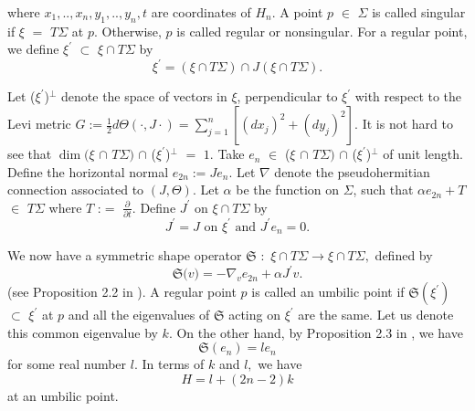 \documentclass[12pt]{amsart}
\theoremstyle{definition}\newtheorem{exa}[thm]{\sc Example}
\theoremstyle{definition}\newtheorem{de}[thm]{\sc Definition}
\theoremstyle{definition}\newtheorem{rem}[thm]{\sc Remark}
\theoremstyle{definition}\newtheorem{prob}[thm]{\it Problem}
\theoremstyle{definition}\newtheorem{fact}[thm]{\sc Fact}
\theoremstyle{definition}\newtheorem{claim}[thm]{\sc Claim}
\numberwithin{equation}{section}
\begin{document}
\noindent where $x_{1},..,x_{n},y_{1},..,y_{n},t$ are coordinates of $H_{n}.$
A point $p$ $\in $ $\Sigma $ is called singular if $\xi $ $=$ $T\Sigma $ at $p.$ Otherwise, $p$ is called regular or nonsingular. For a regular point, we define $\xi ^{\prime }$ $\subset $ $\xi \cap T\Sigma $ by
\begin{equation*}
\xi ^{\prime }=(\xi \cap T\Sigma )\cap J(\xi \cap T\Sigma ).
\end{equation*}

\noindent Let ($\xi ^{\prime }$)$^{\bot }$ denote the space of vectors in $\xi $, perpendicular to $\xi ^{\prime }$ with respect to the Levi metric $G:=\frac{1}{2}d\Theta (\cdot ,J\cdot )=\sum_{j=1}^{n}[(dx_{j})^{2}+(dy_{j})^{2}].$ It is not hard to see that $\dim (\xi 
$ $\cap $ $T\Sigma )$ $\cap $ ($\xi ^{\prime }$)$^{\bot }$ $=$ $1.$ Take $e_{n}$ $\in $ ($\xi $ $\cap $ $T\Sigma )$ $\cap $ ($\xi ^{\prime }$)$^{\bot
} $ of unit length. Define the horizontal normal $e_{2n}:=Je_{n}$. Let 
$\nabla $ denote the pseudohermitian connection associated to $(J,\Theta ).$
Let $\alpha $ be the function on $\Sigma $, such that $\alpha e_{2n}+T$ $\in 
$ $T\Sigma $ where $T$ :$=$ $\frac{\partial }{\partial t}.$ Define $J^{\prime }$ on $\xi \cap T\Sigma $ by
\begin{equation*}
J^{\prime }=J\text{ on }\xi ^{\prime }\text{ and }J^{\prime }e_{n}=0.
\end{equation*}

\noindent We now have a symmetric shape operator $\mathfrak{S}$ $:$ $\xi
\cap T\Sigma \rightarrow \xi \cap T\Sigma ,$ defined by
\begin{equation}
\mathfrak{S(}v\mathfrak{)}=-\nabla _{v}e_{2n}+\alpha J^{\prime }v.
\label{1-1}
\end{equation}
(see Proposition 2.2 in \cite{CCHY1}). A regular point $p$ is
called an umbilic point if $\mathfrak{S}(\xi ^{\prime })$ $\subset $ $\xi
^{\prime }$ at $p$ and all the eigenvalues of $\mathfrak{S}$ acting on $\xi
^{\prime }$ are the same. Let us denote this common eigenvalue by $k.$ On the other hand, by Proposition 2.3
in \cite{CCHY1}, we have
\begin{equation*}
\mathfrak{S}(e_{n})=le_{n}
\end{equation*}
 for some real number $l.$ In terms of $k$ and $l,$ we have
\begin{equation*}
H=l+(2n-2)k
\end{equation*}
at an umbilic point. 
\end{document}

